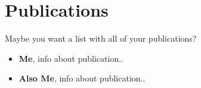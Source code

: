 \chapter{Publications}
\label{chap:research_output}

Maybe you want a list with all of your publications?

\begin{itemize}
  \item \textbf{Me}, info about publication..

  \item \textbf{Also Me}, info about publication..

\end{itemize}


